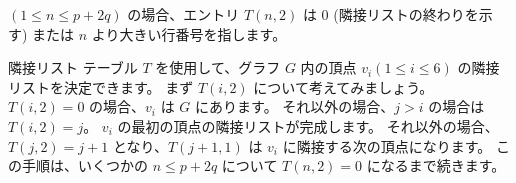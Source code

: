 
$(1 \leq n \leq p+2q)$ の場合、エントリ $T(n, 2)$ は 0 (隣接リストの終わりを示す) または $n$ より大きい行番号を指します。

隣接リスト テーブル $T$ を使用して、グラフ $G$ 内の頂点 $v_i (1 \leq i \leq 6)$ の隣接リストを決定できます。
まず $T(i,2)$ について考えてみましょう。
$T(i,2) = 0$ の場合、$v_i$ は $G$ にあります。 それ以外の場合、$j > i$ の場合は $T(i,2) = j$。 $v_i$ の最初の頂点の隣接リストが完成します。
それ以外の場合、$T(j,2)=j+1$ となり、$T(j+1,1)$ は $v_i$ に隣接する次の頂点になります。 この手順は、いくつかの $n \leq p+2q$ について $T(n,2) = 0$ になるまで続きます。